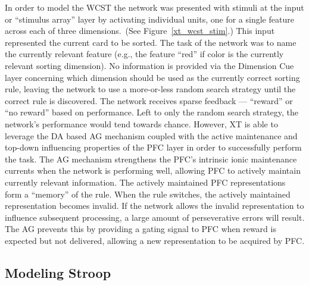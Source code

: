 In order to model the WCST the network was presented with stimuli at the input or ``stimulus array'' layer by activating individual units, one for a single feature across each of three dimensions.~(See Figure~\ref{xt_wcst_stim}.)  This input represented the current card to be sorted.  The task of the network was to name the currently relevant feature (e.g., the feature ``red'' if color is the currently relevant sorting dimension).  No information is provided via the Dimension Cue layer concerning which dimension should be used as the currently correct sorting rule, leaving the network to use a more-or-less random search strategy until the correct rule is discovered.  The network receives sparse feedback --- ``reward'' or ``no reward'' based on performance.  Left to only the random search strategy, the network's performance would tend towards chance.  However, XT is able to leverage the DA based AG mechanism coupled with the active maintenance and top-down influencing properties of the PFC layer in order to successfully perform the task.  The AG mechanism strengthens the PFC's intrinsic ionic maintenance currents when the network is performing well, allowing PFC to actively maintain currently relevant information.  The actively maintained PFC representations form a ``memory'' of the rule.  When the rule switches, the actively maintained representation becomes invalid.  If the network allows the invalid representation to influence subsequent processing, a large amount of perseverative errors will result.  The AG prevents this by providing a gating signal to PFC when reward is expected but not delivered, allowing a new representation to be acquired by PFC.



%
%
%


\subsection{Modeling Stroop} 

